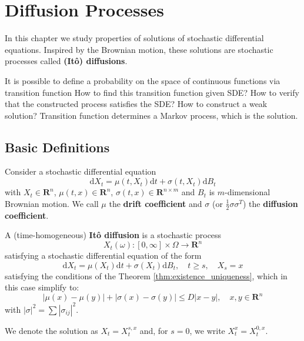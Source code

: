 \chapter{Diffusion Processes}

In this chapter we study properties of solutions of stochastic differential equations. Inspired by the Brownian motion, these solutions are stochastic processes called \textbf{(Itô) diffusions}. 

It is possible to define a probability on the space of continuous functions via transition function
How to find this transition function given SDE?
How to verify that the constructed process satisfies the SDE? 
How to construct a weak solution? Transition function determines a Markov process, which is the solution. 

\section{Basic Definitions}

Consider a stochastic differential equation 
\begin{equation}\label{eq:202301231650}
    \mathrm{d} X_t = \mu(t, X_t) \mathrm{d}t + \sigma(t, X_t) \mathrm{d}B_t
\end{equation}
with $X_t \in \textbf{R}^n$, $\mu(t,x) \in \textbf{R}^n$, $\sigma(t,x) \in \textbf{R}^{n \times m}$ and $B_t$ is $m$-dimensional Brownian motion. We call $\mu$ the \textbf{drift coefficient} and $\sigma$ (or $\frac{1}{2} \sigma \sigma^T$) the \textbf{diffusion coefficient}. 

\begin{definition}
    A (time-homogeneous) \textbf{Itô diffusion} is a stochastic process 
    \[
        X_t(\omega) : [0, \infty] \times \Omega \longrightarrow \textbf{R}^n
    \]
    satisfying a stochastic differential equation of the form 
    \begin{equation*}
        \mathrm{d} X_t = \mu(X_t) \mathrm{d}t + \sigma(X_t) \mathrm{d}B_t, \quad t \geq s, \quad X_s = x
    \end{equation*}
    satisfying the conditions of the Theorem \ref{thm:existence_uniqueness}, which in this case simplify to: 
    \begin{equation*}
        |\mu(x) - \mu(y)| + |\sigma(x) - \sigma(y)| \leq D|x-y|, \quad x, y \in \textbf{R}^n
    \end{equation*}
    with $|\sigma|^2 = \sum |\sigma_{ij}|^2$. 

    We denote the solution as $X_t = X_t^{s,x}$ and, for $s = 0$, we write $X_t^x = X_t^{0,x}$.
\end{definition}

